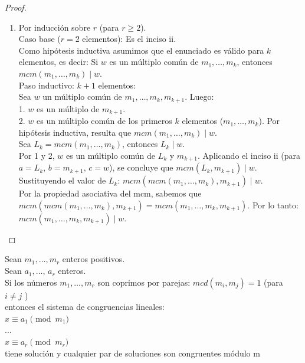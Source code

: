 \begin{proof}
\begin{enumerate}[label=\roman*)]
Esta contradicción muestra que: $r=0$. Es decir: $c=q \cdot m$. Es decir: $mcm(a,b) \mid c$.
\item Por inducción sobre $r$ (para $r \geq 2$). \\
Caso base ($r = 2$ elementos): Es el inciso ii. \\
Como hipótesis inductiva asumimos que el enunciado es válido para $k$ elementos, es decir: Si $w$ es un múltiplo común de $m_1, \dots, m_k$, entonces $mcm(m_1, \dots, m_k) \mid w$. \\
Paso inductivo:  $k + 1$ elementos: \\
Sea $w$ un múltiplo común de $m_1, \dots, m_k, m_{k+1}$. Luego: \\
1. $w$ es un múltiplo de $m_{k+1}$. \\
2. $w$ es un múltiplo común de los primeros $k$ elementos ($m_1, \dots, m_k$).
Por hipótesis inductiva, resulta que $mcm(m_1, \dots, m_k) \mid w$. \\
Sea $L_k = mcm(m_1, \dots, m_k)$, entonces $L_k \mid w$. \\
Por 1 y 2, $w$ es un múltiplo común de $L_k$ y $m_{k+1}$.
Aplicando el inciso ii (para $a=L_k$, $b=m_{k+1}$, $c=w$), se concluye que $mcm(L_k, m_{k+1}) \mid w$. \\
Sustituyendo el valor de $L_k$: $mcm(mcm(m_1, \dots, m_k), m_{k+1}) \mid w$. \\
Por la propiedad asociativa del mcm, sabemos que $mcm(mcm(m_1, \dots, m_k), m_{k+1}) = mcm(m_1, \dots, m_k, m_{k+1})$. Por lo tanto: \\
$mcm(m_1, \dots, m_k, m_{k+1}) \mid w$.
\end{enumerate}
\end{proof}

\begin{enunciado} \label{enun:teorRestoChino}\leavevmode\par
Sean $m_{1}, \ldots, m_{r}$ enteros positivos.\\
Sean $a_{1}, \ldots$, $a_r$ enteros.\\
Si los números $m_{1}, \ldots, m_{r}$ son coprimos por parejas: $mcd(m_{i}, m_{j})=1$ (para $i \neq j$ ) \\ 
entonces el sistema de congruencias lineales:\\
$x \equiv a_{1} \pmod {m_{1}}$ \\
$\ldots$ \\
$x \equiv a_{r} \pmod {m_{r}}$\\
tiene solución y cualquier par de soluciones son congruentes módulo m
\end{enunciado}

